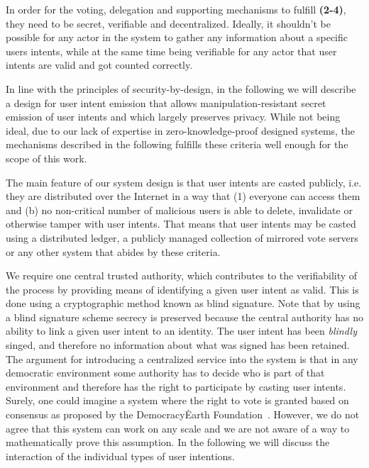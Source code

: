 In order for the voting, delegation and supporting mechanisms to fulfill \textbf{(2-4)}, they need to be secret, verifiable and decentralized.
Ideally, it shouldn't be possible for any actor in the system to gather any information about a specific users intents, while at the same time being verifiable for any actor that user intents are valid and got counted correctly. 

In line with the principles of security-by-design, in the following we will describe a design for user intent emission that allows manipulation-resistant secret emission of user intents and which largely preserves privacy.
While not being ideal, due to our lack of expertise in zero-knowledge-proof designed systems, the mechanisms described in the following fulfills these criteria well enough for the scope of this work.

The main feature of our system design is that user intents are casted publicly, i.e. they are distributed over the Internet in a way that (1) everyone can access them and (b) no non-critical number of malicious users is able to delete, invalidate or otherwise tamper with user intents.
That means that user intents may be casted using a distributed ledger, a publicly managed collection of mirrored vote servers or any other system that abides by these criteria.

We require one central trusted authority, which contributes to the verifiability of the process by providing means of identifying a given user intent as valid.
This is done using a cryptographic method known as blind signature.
Note that by using a blind signature scheme secrecy is preserved because the central authority has no ability to link a given user intent to an identity.
The user intent has been \emph{blindly} singed, and therefore no information about what was signed has been retained. 
The argument for introducing a centralized service into the system is that in any democratic environment some authority has to decide who is part of that environment and therefore has the right to participate by casting user intents.
Surely, one could imagine a system where the right to vote is granted based on consensus as proposed by the Democracy\.Earth Foundation~\parencite{Democracy.Earth2018}.
However, we do not agree that this system can work on any scale and we are not aware of a way to mathematically prove this assumption.
In the following we will discuss the interaction of the individual types of user intentions.

